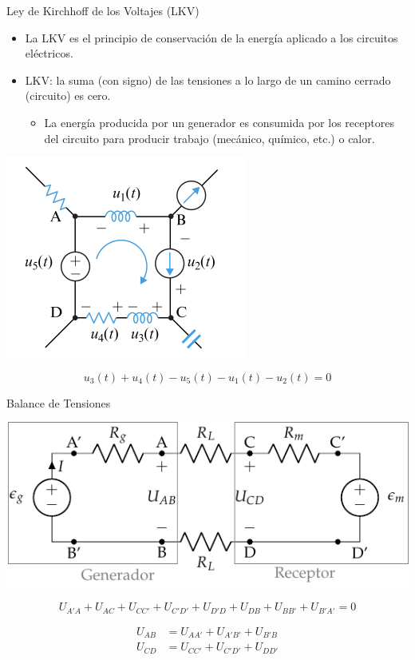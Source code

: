 \documentclass[aspectratio=169, xcolor={usenames,svgnames,dvipsnames}]{beamer}
\begin{document}
\begin{frame}[label={sec:org89f9af6}]{Ley de Kirchhoff de los Voltajes (LKV)}
\begin{itemize}
\item La \alert{LKV} es el principio de conservación de la energía aplicado a los circuitos eléctricos.

\item \alert{LKV}: la suma (con signo) de las tensiones a lo largo de un camino cerrado (circuito) es cero.

\begin{itemize}
\item La energía producida por un generador es consumida por los receptores del circuito para producir trabajo (mecánico, químico, etc.) o calor.
\end{itemize}
\end{itemize}

\begin{center}
\includegraphics[height=0.4\textheight]{figs/LKV_FM.pdf}
\end{center}
\[
u_3(t) + u_4 (t) - u_5 (t) - u_1 (t) - u_2 (t)  = 0
\]
\end{frame}

\begin{frame}[label={sec:org1180ac6}]{Balance de Tensiones}
\begin{center}
\includegraphics[height=0.5\textheight]{figs/circuito_lkv.pdf}
\end{center}

\begin{equation*}
  U_{A'A} + U_{AC} + U_{CC'} + U_{C'D'} + U_{D'D} + U_{DB} + U_{BB'} + U_{B'A'} = 0
\end{equation*}

\begin{align*}
  U_{AB} &= U_{AA'} + U_{A'B'} + U_{B'B}\\
  U_{CD} &= U_{CC'} + U_{C'D'} + U_{DD'}
\end{align*}
\end{frame}
\end{document}
